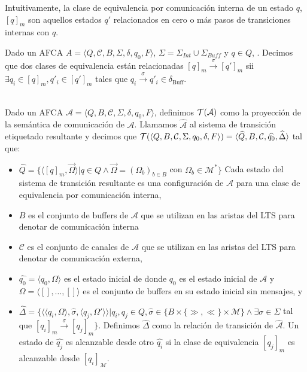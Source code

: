 Intuitivamente, la clase de equivalencia por comunicación interna de un estado $q$, $[q]_m$ son aquellos estados $q'$ relacionados en cero o más pasos de transiciones internas con $q$.

Dado un AFCA $A = \langle Q, \mathcal{C}, B, \Sigma, \delta, q_0, F \rangle$, $\Sigma = \Sigma_\mathit{Int} \cup \Sigma_\mathit{Buff}$ y $q \in Q$, . Decimos que dos clases de equivalencia están relacionadas $[q]_m \xrightarrow{\sigma} [q']_m$ sii $\exists q_i \in [q]_m, q'_i \in [q']_m$ tales que $q_i \xrightarrow{\sigma} q'_i \in \delta_{\text{Buff}}$.

\begin{definition}\label{def:pci}\ \\
Dado un AFCA $\mathcal{A} = \langle Q, B, \mathcal{C}, \Sigma, \delta, q_0, F \rangle$, definimos $\mathcal{T}(\mathcal{A})$ como la proyección de la semántica de comunicación de $\mathcal{A}$. Llamamos $\widehat{\mathcal{A}}$ al sistema de transición etiquetado resultante y decimos que $\mathcal{T} (\langle Q, B, \mathcal{C}, \Sigma, q_0, \delta, F \rangle)= \langle \widehat{Q}, B, \mathcal{C}, \widehat{q_0}, \widehat{\Delta} \rangle$ tal que:
\begin{itemize}
    \item $ \widehat{Q} = \{ \langle [q]_m, \overrightarrow{\Omega} \rangle | q \in Q \land \overrightarrow{\Omega} = (\Omega_b)_{b \in B}$ con $\Omega_b \in \mathcal{M}^* \}$ Cada estado del sistema de transición resultante es una configuración de $\mathcal{A}$ para una clase de equivalencia por comunicación interna,
    \item $B$ es el conjunto de buffers de $\mathcal{A}$ que se utilizan en las aristas del LTS para denotar de comunicación interna 
    \item $\mathcal{C}$ es el conjunto de canales de $\mathcal{A}$ que se utilizan en las aristas del LTS para denotar de comunicación externa,  
    \item $\widehat{q_0}= \langle q_0, \Omega \rangle$ es el estado inicial de  donde $q_0$ es el estado inicial de $\mathcal{A}$ y $\Omega = \langle [], \ldots, [] \rangle$ es el conjunto de buffers en su estado inicial sin mensajes, y
    \item $\widehat{\Delta}= \{\langle \langle q_i, \Omega \rangle, \widehat{\sigma},\langle q_j, \Omega' \rangle \rangle | q_i, q_j \in Q, \widehat{\sigma} \in \{B \times \{\gg, \ll\} \times \mathcal{M}\} \land \exists \sigma \in \Sigma$ tal que  $[q_i]_m \xrightarrow{\sigma} [q_j]_m \}$. Definimos $\widehat{\Delta}$ como la relación de transición de $\widehat{\mathcal{A}}$. Un estado de $\widehat{q_j}$ es alcanzable desde otro $\widehat{q_i}$ si la clase de equivalencia $[q_j]_m$ es alcanzable desde $[q_i]_\mathcal{M}$.
\end{itemize}
\end{definition}


